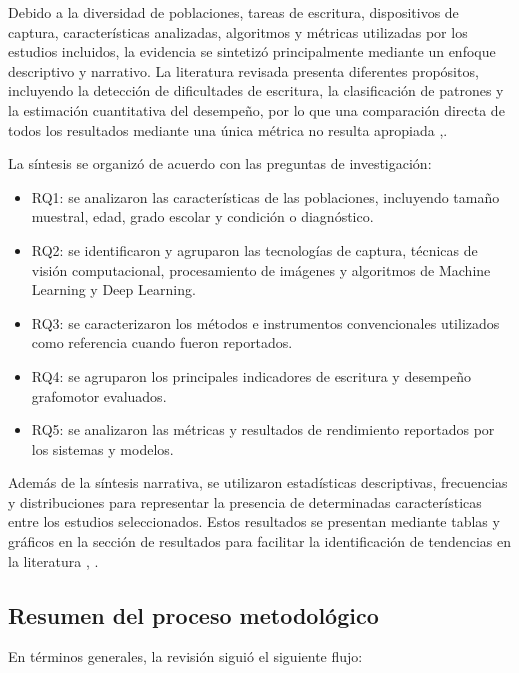 \documentclass{iaesarticle}
\begin{document}
Debido a la diversidad de poblaciones, tareas de escritura, dispositivos de captura, características analizadas, algoritmos y métricas utilizadas por los estudios incluidos, la evidencia se sintetizó principalmente mediante un enfoque descriptivo y narrativo. La literatura revisada presenta diferentes propósitos, incluyendo la detección de dificultades de escritura, la clasificación de patrones y la estimación cuantitativa del desempeño, por lo que una comparación directa de todos los resultados mediante una única métrica no resulta apropiada \cite{cruzes2011},\cite{campbell2020}.

La síntesis se organizó de acuerdo con las preguntas de investigación:

\begin{itemize}
    \item RQ1: se analizaron las características de las poblaciones, incluyendo tamaño muestral, edad, grado escolar y condición o diagnóstico.

    \item RQ2: se identificaron y agruparon las tecnologías de captura, técnicas de visión computacional, procesamiento de imágenes y algoritmos de Machine Learning y Deep Learning.

    \item RQ3: se caracterizaron los métodos e instrumentos convencionales utilizados como referencia cuando fueron reportados.

    \item RQ4: se agruparon los principales indicadores de escritura y desempeño grafomotor evaluados.

    \item RQ5: se analizaron las métricas y resultados de rendimiento reportados por los sistemas y modelos.
\end{itemize}

Además de la síntesis narrativa, se utilizaron estadísticas descriptivas, frecuencias y distribuciones para representar la presencia de determinadas características entre los estudios seleccionados. Estos resultados se presentan mediante tablas y gráficos en la sección de resultados para facilitar la identificación de tendencias en la literatura \cite{cruzes2011}, \cite{campbell2020}.

\subsection{Resumen del proceso metodológico}

En términos generales, la revisión siguió el siguiente flujo:
\end{document}
